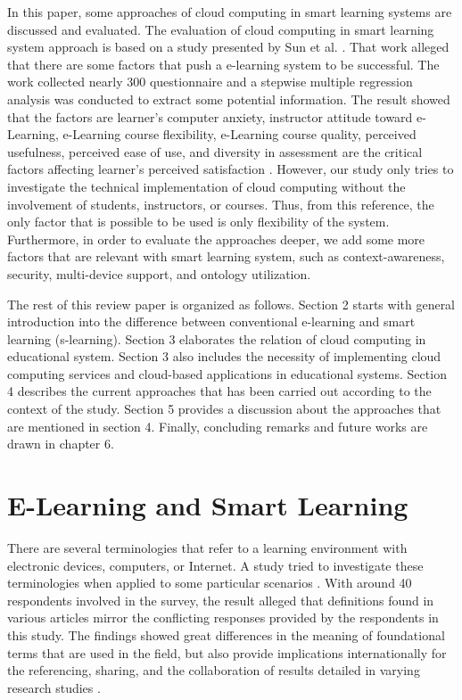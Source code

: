 \documentclass[journal]{vgtc}
\begin{document}
In this paper, some approaches of cloud computing in smart learning systems are discussed and evaluated. The evaluation of cloud computing in smart learning system approach is based on a study presented by Sun et al. \cite{Sun2008}. That work alleged that there are some factors that push a e-learning system to be successful. The work collected nearly 300 questionnaire and a stepwise multiple regression analysis was conducted to extract some potential information. The result showed that the factors are learner's computer anxiety, instructor attitude toward e-Learning, e-Learning course flexibility, e-Learning course quality, perceived usefulness, perceived ease of use, and diversity in assessment are the critical factors affecting learner's perceived satisfaction \cite{Sun2008}. However, our study only tries to investigate the technical implementation of cloud computing without the involvement of students, instructors, or courses. Thus, from this reference, the only factor that is possible to be used is only flexibility of the system. Furthermore, in order to evaluate the approaches deeper, we add some more factors that are relevant with smart learning system, such as context-awareness, security, multi-device support, and ontology utilization.

The rest of this review paper is organized as follows. Section 2 starts with general introduction into the difference between conventional e-learning and smart learning (s-learning). Section 3 elaborates the relation of cloud computing in educational system. Section 3 also includes the necessity of implementing cloud computing services and cloud-based applications in educational systems. Section 4 describes the current approaches that has been carried out according to the context of the study. Section 5 provides a discussion about the approaches that are mentioned in section 4. Finally, concluding remarks and future works are drawn in chapter 6.

\section{E-Learning and Smart Learning}
There are several terminologies that refer to a learning environment with electronic devices, computers, or Internet. A study tried to investigate these terminologies when applied to some particular scenarios \cite{Moore2011}. With around 40 respondents involved in the survey, the result alleged that definitions found in various articles mirror the conflicting responses provided by the respondents in this study. The findings showed great differences in the meaning of foundational terms that are used in the field, but also provide implications internationally for the referencing, sharing, and the collaboration of results detailed in varying research studies \cite{Moore2011}.
\end{document}
